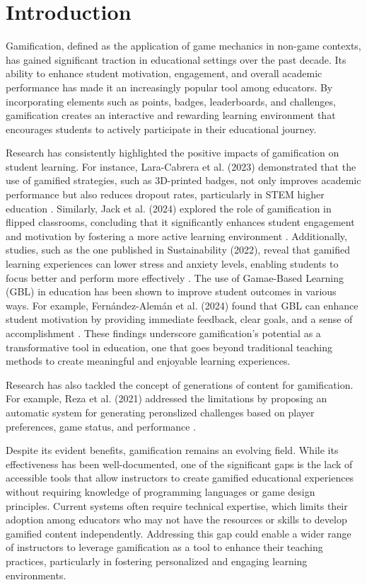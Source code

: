 \chapter{Introduction}\label{chap:intro}

Gamification, defined as the application of game mechanics in non-game contexts, has gained significant traction in educational settings over the past decade. Its ability to enhance student motivation, engagement, and overall academic performance has made it an increasingly popular tool among educators. By incorporating elements such as points, badges, leaderboards, and challenges, gamification creates an interactive and rewarding learning environment that encourages students to actively participate in their educational journey.

Research has consistently highlighted the positive impacts of gamification on student learning. For instance, Lara-Cabrera et al. (2023)  demonstrated that the use of gamified strategies, such as 3D-printed badges, not only improves academic performance but also reduces dropout rates, particularly in STEM higher education \cite{lara2023badges}. Similarly, Jack et al. (2024) explored the role of gamification in flipped classrooms, concluding that it significantly enhances student engagement and motivation by fostering a more active learning environment \cite{jack2024gamification}. Additionally, studies, such as the one published in Sustainability (2022), reveal that gamified learning experiences can lower stress and anxiety levels, enabling students to focus better and perform more effectively \cite{sustainability2022gamification}. The use of Gamae-Based Learning (GBL) in education has been shown to improve student outcomes in various ways. For example, Fernández-Alemán et al. (2024) found that GBL can enhance student motivation by providing immediate feedback, clear goals, and a sense of accomplishment \cite{fernando2024}. These findings underscore gamification's potential as a transformative tool in education, one that goes beyond traditional teaching methods to create meaningful and enjoyable learning experiences.


Research has also tackled the concept of generations of content for gamification. For example, Reza et al. (2021) addressed the limitations by proposing an automatic system for generating peronslized challenges based on player preferences, game status, and performance \cite{khoshkangini2021}.

Despite its evident benefits, gamification remains an evolving field. While its effectiveness has been well-documented, one of the significant gaps is the lack of accessible tools that allow instructors to create gamified educational experiences without requiring knowledge of programming languages or game design principles. Current systems often require technical expertise, which limits their adoption among educators who may not have the resources or skills to develop gamified content independently. Addressing this gap could enable a wider range of instructors to leverage gamification as a tool to enhance their teaching practices, particularly in fostering personalized and engaging learning environments.

